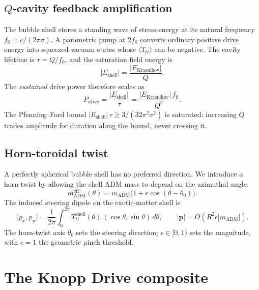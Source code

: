 \documentclass[11pt,a4paper]{article}
\begin{document}
\subsection{$Q$-cavity feedback amplification}\label{ssec:feedback}

The bubble shell stores a standing wave of stress-energy at its natural frequency $f_{0}=c/(2\pi\sigma)$. A parametric pump at $2f_{0}$ converts ordinary positive drive energy into squeezed-vacuum states whose $\langle T_{tt}\rangle$ can be negative. The cavity lifetime is $\tau=Q/f_{0}$, and the saturation field energy is
\begin{equation}
|E_{\mathrm{shell}}| = \frac{|E_{\mathrm{Krasnikov}}|}{Q}.
\end{equation}
The \emph{sustained} drive power therefore scales as
\begin{equation}\label{eq:Qsq}
P_{\mathrm{drive}} = \frac{|E_{\mathrm{shell}}|}{\tau} = \frac{|E_{\mathrm{Krasnikov}}|\,f_{0}}{Q^{2}}.
\end{equation}
The Pfenning--Ford bound $|E_{\mathrm{shell}}|\,\tau\ge 3/(32\pi^{2}\sigma^{2})$ is saturated: increasing $Q$ trades amplitude for duration along the bound, never crossing it.

\subsection{Horn-toroidal twist}\label{ssec:horn}

A perfectly spherical bubble shell has no preferred direction. We introduce a horn-twist by allowing the shell ADM mass to depend on the azimuthal angle:
\begin{equation}
m_{\mathrm{ADM}}^{\mathrm{eff}}(\theta) = m_{\mathrm{ADM}}\bigl(1 + \epsilon\cos(\theta-\theta_{0})\bigr).
\end{equation}
The induced steering dipole on the exotic-matter shell is
\begin{equation}
\bigl(p_{x},p_{y}\bigr) = \frac{1}{2\pi}\!\int_{0}^{2\pi}\!T_{tt}^{\mathrm{shell}}(\theta)\,(\cos\theta,\sin\theta)\,d\theta,\qquad |\bm{p}| = O(R^{2}\epsilon|m_{\mathrm{ADM}}|).
\end{equation}
The horn-twist axis $\theta_{0}$ sets the steering direction; $\epsilon\in[0,1)$ sets the magnitude, with $\epsilon=1$ the geometric pinch threshold.

\section{The Knopp Drive composite}\label{sec:composite}
\end{document}
